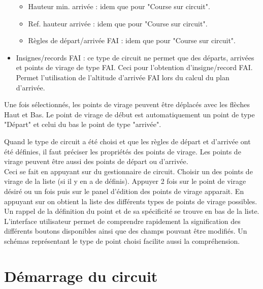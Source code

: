 \begin{itemize}
\begin{itemize}
  \item Hauteur min. arrivée : idem que pour "Course sur circuit".
  \item Ref. hauteur arrivée : idem que pour "Course sur circuit".
   \item Règles de départ/arrivée FAI : idem que pour "Course sur circuit".
 \end{itemize}
\item Insignes/records FAI :  ce type de circuit ne permet que des départs, arrivées et points de virage de type FAI. Ceci pour l'obtention d'insigne/record FAI. Permet l'utilisation de l'altitude d'arrivée FAI lors du calcul du plan d'arrivée.
\end{itemize}

Une fois sélectionnés, les points de virage peuvent être déplacés avec les flèches Haut et Bas. Le point de virage de début est automatiquement un point de type "Départ" et celui du bas le point de type "arrivée".

Quand le type de circuit a été choisi et que les règles de départ et d'arrivée ont été définies, il faut préciser les propriétés des points de virage. Les points de virage peuvent être aussi des points de départ ou d'arrivée.\\
Ceci se fait en appuyant sur   du gestionnaire de circuit. Choisir un des points de virage de la liste (si il y en a de définis). Appuyer 2 fois sur le point de virage désiré ou un fois puis sur  le panel d'édition des points de virage apparait. En appuyant sur   on obtient la liste des différents types de points de virage possibles. Un rappel de la définition du point et de sa spécificité se trouve en bas de la liste.
L'interface utilisateur permet de comprendre rapidement la signification des différents boutons disponibles ainsi que des champs pouvant être modifiés. Un schémas représentant le type de point choisi facilite aussi la compréhension.

\section{Démarrage du circuit}\label{sec:demarrage-circuit}

